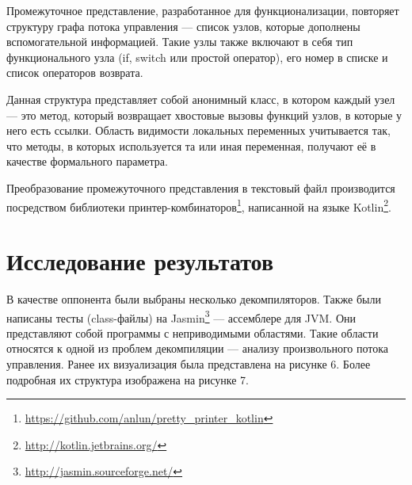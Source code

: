 \documentclass[14pt]{extarticle}
\begin{document}
Промежуточное представление, разработанное для функционализации, повторяет структуру графа потока управления --- список узлов, которые дополнены вспомогательной информацией. Такие узлы также включают в себя тип функционального узла (if, switch или простой оператор), его номер в списке и список операторов возврата. 

Данная структура представляет собой анонимный класс, в котором каждый узел --- это метод, который возвращает хвостовые вызовы функций узлов, в которые у него есть ссылки. Область видимости локальных переменных учитывается так, что методы, в которых используется та или иная переменная, получают её в качестве формального параметра. 

Преобразование промежуточного представления в текстовый файл производится посредством библиотеки принтер-комбинаторов\footnote{\url{https://github.com/anlun/pretty_printer_kotlin}}, написанной на языке Kotlin\footnote{\url{http://kotlin.jetbrains.org/}}.

\newpage
\section{Исследование результатов}

В качестве оппонента были выбраны несколько декомпиляторов. Также были написаны тесты (class-файлы) на Jasmin\footnote{\url{http://jasmin.sourceforge.net/}} --- ассемблере для JVM. Они представляют собой программы с неприводимыми областями. Такие области относятся к одной из проблем декомпиляции --- анализу произвольного потока управления. Ранее их визуализация была представлена на рисунке 6. Более подробная их структура изображена на рисунке 7.
\end{document}
